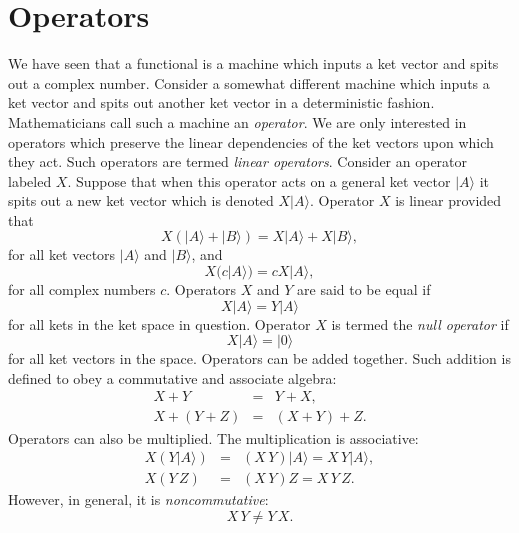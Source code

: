 \section{Operators}
We have seen that a functional is a machine which inputs a ket vector and
spits out a complex number. Consider a 
somewhat different machine which inputs a ket
vector and spits out another ket vector in a deterministic fashion. Mathematicians
call such a machine an {\em operator}. We are only interested in operators
which preserve the linear dependencies of the ket vectors upon which
they act. Such operators are termed {\em linear operators}. Consider an operator
labeled $X$. Suppose that when this operator acts on a general ket vector
$|A \rangle$ it spits out a new ket vector which is denoted
$X|A\rangle$. Operator $X$ is linear provided that
\begin{equation}
X (|A\rangle + |B \rangle) = X|A\rangle + X|B \rangle,
\end{equation}
for all ket vectors $|A\rangle$ and $|B \rangle$, and
\begin{equation}
X(c |A\rangle) = c X |A\rangle,
\end{equation}
for all complex numbers $c$. Operators $X$ and $Y$ are said to be equal
if
\begin{equation}
X |A\rangle = Y|A\rangle
\end{equation}
for all kets in the ket space in question. Operator $X$ is termed the
{\em null operator}
if
\begin{equation}
X  |A\rangle = |0\rangle
\end{equation}
for all ket vectors in the space. Operators can be added together. Such addition 
is defined to obey a commutative and associate algebra:
\begin{eqnarray}
X + Y &= &Y + X,\\[0.5ex]
X + (Y + Z) &=& (X + Y ) + Z.
\end{eqnarray}
Operators can also be multiplied. The multiplication is associative:
\begin{eqnarray}
X(Y|A\rangle)& =& (X\,Y) |A\rangle = X\,Y| A \rangle,\\[0.5ex]
X(Y\,Z)& = &(X\,Y) Z = X\,Y\,Z.
\end{eqnarray}
However, in general, it is {\em noncommutative}:
\begin{equation}
X\,Y \neq Y\,X.
\end{equation}

